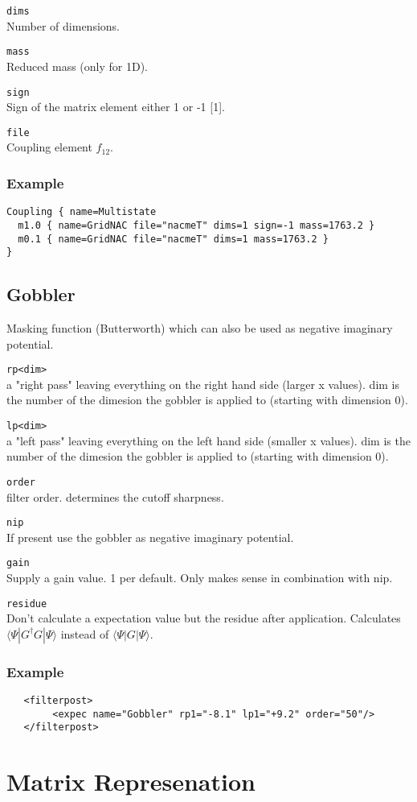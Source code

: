 \documentclass[a4paper,12pt]{scrbook}
\newcommand{\option}[2]{\item \texttt{#1}\\ #2}
\begin{document}
\begin{options}
 \option{dims}{Number of dimensions.}
 \option{mass}{Reduced mass (only for 1D).}
 \option{sign}{Sign of the matrix element either 1 or -1 [1].}
 \option{file}{Coupling element $f_{12}$.}
\end{options}

\subsubsection*{Example}
\begin{verbatim}
Coupling { name=Multistate
  m1.0 { name=GridNAC file="nacmeT" dims=1 sign=-1 mass=1763.2 }
  m0.1 { name=GridNAC file="nacmeT" dims=1 mass=1763.2 }
}
\end{verbatim}


\subsection{Gobbler}
Masking function (Butterworth) which can also be used as negative imaginary potential.

\begin{options}
\option{rp<dim>}{a "right pass" leaving everything on the right hand side (larger x values). dim is the number of the dimesion the gobbler is applied to (starting with dimension 0).}
\option{lp<dim>}{a "left pass" leaving everything on the left hand side (smaller x values). dim is the number of the dimesion the gobbler is applied to (starting with dimension 0).}
\option{order}{filter order. determines the cutoff sharpness.}
\option{nip}{If present use the gobbler as negative imaginary potential.}
\option{gain}{Supply a gain value. 1 per default. Only makes sense in combination with nip.}
\option{residue}{Don't calculate a expectation value but the residue after application. Calculates $\langle \Psi|G^\dagger G|\Psi\rangle$ instead of $\langle \Psi|G|\Psi\rangle$.}
\end{options}

\subsubsection*{Example}
\begin{verbatim}
   <filterpost>
        <expec name="Gobbler" rp1="-8.1" lp1="+9.2" order="50"/>
   </filterpost>
\end{verbatim}


\section{Matrix Represenation}
\end{document}
